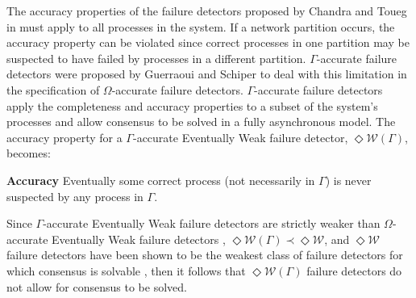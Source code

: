 \documentclass[runningheads,a4paper]{llncs}
\begin{document}
The accuracy properties of the failure detectors proposed by Chandra and Toueg in \cite{DeepakChandra1996} must apply to all processes in the system. If a network partition occurs, the accuracy property can be violated since correct processes in one partition may be suspected to have failed by processes in a different  partition. $\Gamma$-accurate failure detectors were proposed by Guerraoui and Schiper \cite{Guerraoui96gammaaccurate} to deal with this limitation in the specification of $\Omega$-accurate failure detectors. $\Gamma$-accurate failure detectors apply the completeness and accuracy properties to a subset of the system's processes and allow consensus to be solved in a fully asynchronous model. The accuracy property for a $\Gamma$-accurate Eventually Weak failure detector, $\Diamond\mathcal{W}(\Gamma)$, becomes: \par
\textbf{Accuracy} Eventually some correct process (not necessarily in $\Gamma$) is never suspected by any process in $\Gamma$.\par
Since $\Gamma$-accurate Eventually Weak failure detectors are strictly weaker than $\Omega$-accurate Eventually Weak failure detectors \cite{Guerraoui96gammaaccurate}, $\Diamond\mathcal{W}(\Gamma) \prec \Diamond\mathcal{W}$, and  $\Diamond\mathcal{W}$ failure detectors have been shown to be the weakest class of failure detectors for which consensus is solvable \cite{Chandra1996}, then it follows that $\Diamond\mathcal{W}(\Gamma)$ failure detectors do not allow for consensus to be solved.\par
\end{document}
